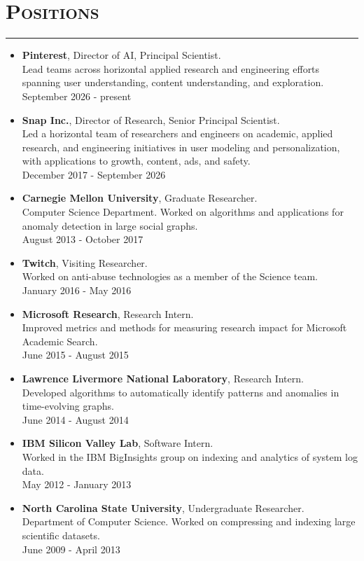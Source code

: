 \documentclass{article}
\newcommand{\HRule}{\rule{\linewidth}{0.5mm}}
\begin{document}
\section*{\bf \textsc{Positions}}
\vspace{-5mm}\HRule
\begin{itemize}
\item {\bf Pinterest}, Director of AI, Principal Scientist. \\ Lead teams across horizontal applied research and engineering efforts spanning user understanding, content understanding, and exploration. \\ September 2026 - present
\item {\bf Snap Inc.}, Director of Research, Senior Principal Scientist. \\ Led a horizontal team of researchers and engineers on academic, applied research, and engineering initiatives in user modeling and personalization, with applications to growth, content, ads, and safety. \\ December 2017 - September 2026
\item {\bf Carnegie Mellon University}, Graduate Researcher. \\ Computer Science Department. Worked on algorithms and applications for anomaly detection in large social graphs. \\ August 2013 - October 2017
\item {\bf Twitch}, Visiting Researcher. \\ Worked on anti-abuse technologies as a member of the Science team. \\ January 2016 - May 2016
\item {\bf Microsoft Research}, Research Intern. \\ Improved metrics and methods for measuring research impact for Microsoft Academic Search. \\ June 2015 - August 2015
\item {\bf Lawrence Livermore National Laboratory}, Research Intern. \\ Developed algorithms to automatically identify patterns and anomalies in time-evolving graphs. \\ June 2014 - August 2014
\item {\bf IBM Silicon Valley Lab}, Software Intern. \\ Worked in the IBM BigInsights group on indexing and analytics of system log data. \\ May 2012 - January 2013
\item {\bf North Carolina State University}, Undergraduate Researcher. \\ Department of Computer Science. Worked on compressing and indexing large scientific datasets. \\ June 2009 - April 2013
\end{itemize}
\end{document}
